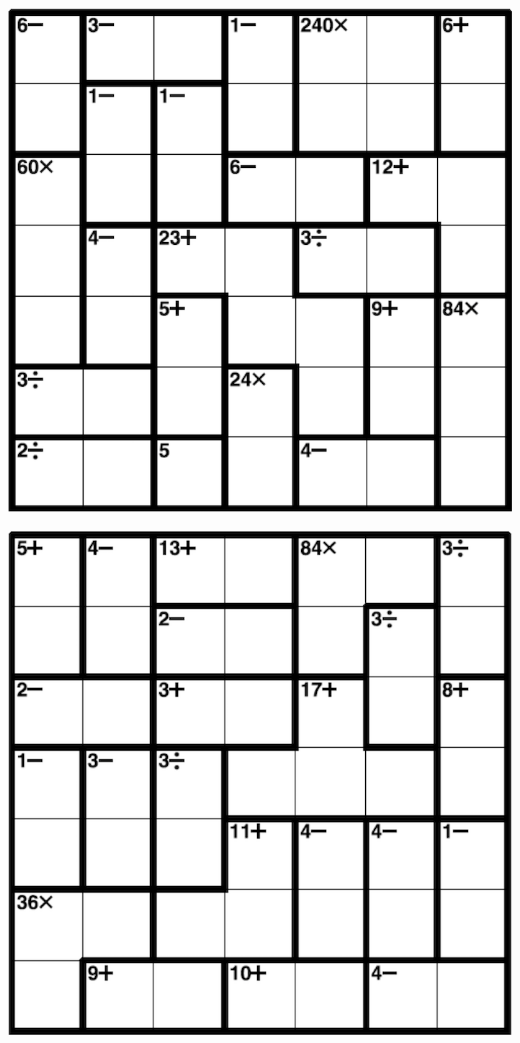 
\includegraphics[scale=1]{Gambar/Lampiran/7x7_11.png}

\includegraphics[scale=1]{Gambar/Lampiran/7x7_12.png}
